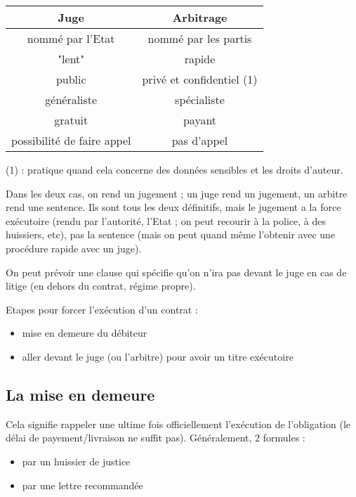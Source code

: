 	
	\begin{center}
	\begin{tabular}{c|c}
		\textbf{Juge} & \textbf{Arbitrage} \\ 
		\hline\hline nommé par l'Etat & nommé par les partis \\ 
		\hline "lent" & rapide \\ 
		\hline public & privé et confidentiel (1) \\ 
		\hline généraliste & spécialiste \\ 
		\hline gratuit & payant \\ 
		\hline possibilité de faire appel & pas d'appel \\
		\hline 
	\end{tabular} 
	\end{center}
	
	(1) : pratique quand cela concerne des données sensibles et les droits d'auteur.
	
	Dans les deux cas, on rend un jugement ; un juge rend un jugement, un arbitre rend une sentence. Ils sont tous les deux définitifs, mais le jugement a la force exécutoire (rendu par l'autorité, l'Etat ; on peut recourir à la police, à des huissiers, etc), pas la sentence (mais on peut quand même l'obtenir avec une procédure rapide avec un juge).
	
	On peut prévoir une clause qui spécifie qu'on n'ira pas devant le juge en cas de litige (en dehors du contrat, régime propre).
	
	Etapes pour forcer l'exécution d'un contrat : 
	
	\begin{itemize}
		\item mise en demeure du débiteur
		\item aller devant le juge (ou l'arbitre) pour avoir un titre exécutoire
	\end{itemize}
	
		\subsection{La mise en demeure}
		
		Cela signifie rappeler une ultime fois officiellement l'exécution de l'obligation (le délai de payement/livraison ne suffit pas). Généralement, 2 formules :
		
		\begin{itemize}
			\item par un huissier de justice
			\item par une lettre recommandée
		\end{itemize}
		
